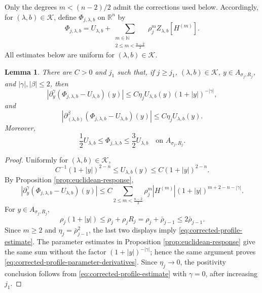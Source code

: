 \documentclass[11pt]{article}
\numberwithin{equation}{section}
\newtheorem{lemma}[theorem]{Lemma}
\theoremstyle{remark}
\newcommand{\R}{\mathbb R}
\begin{document}
Only the degrees \(m<(n-2)/2\) admit the corrections used below. Accordingly,
for \((\lambda,b)\in\mathcal K\), define
\(\Phi_{j,\lambda,b}\) on \(\R^n\) by
\begin{equation}\label{eq:corrected-profile}
 \Phi_{j,\lambda,b}
 =U_{\lambda,b}
 +\sum_{\substack{m\in\mathbb N\\2\le m<\frac{n-2}{2}}}
  \rho_j^mZ_{\lambda,b}[H^{(m)}].
\end{equation}
{
All estimates below are uniform for
\((\lambda,b)\in\mathcal K\).}
\begin{lemma}\label{lem:corrected-profile-estimate}
There are \(C>0\) and \(j_1\) such that, if \(j\ge j_1\),
\((\lambda,b)\in\mathcal K\), \(y\in A_{\sigma_j,R_j}\), and
\(|\gamma|,|\beta|\le2\), then
\begin{equation}\label{eq:corrected-profile-estimate}
 \left|
 \partial_y^\gamma
 (\Phi_{j,\lambda,b}-U_{\lambda,b})(y)
 \right|
 \le C\eta_jU_{\lambda,b}(y)(1+|y|)^{-|\gamma|},
\end{equation}
and
\begin{equation}\label{eq:corrected-profile-parameter-derivatives}
 \left|
 \partial_{(\lambda,b)}^\beta
 (\Phi_{j,\lambda,b}-U_{\lambda,b})(y)
 \right|
 \le C\eta_jU_{\lambda,b}(y).
\end{equation}
Moreover,
\[
 \frac12U_{\lambda,b}
 \le\Phi_{j,\lambda,b}
 \le\frac32U_{\lambda,b}
 \quad\text{on }A_{\sigma_j,R_j}.
\]
\end{lemma}

\begin{proof}
Uniformly for \((\lambda,b)\in\mathcal K\),
\[
 C^{-1}(1+|y|)^{2-n}
 \le U_{\lambda,b}(y)
 \le C(1+|y|)^{2-n}.
\]
By Proposition  \ref{prop:euclidean-response},
\[
 \left|
 \partial_y^\gamma
 (\Phi_{j,\lambda,b}-U_{\lambda,b})(y)
 \right|
 \le C\sum_{2\le m<\frac{n-2}{2}}
 \rho_j^m|H^{(m)}|
 (1+|y|)^{m+2-n-|\gamma|}.
\]
For \(y\in A_{\sigma_j,R_j}\),
\[
 \rho_j(1+|y|)
 \le\rho_j+\rho_jR_j
 =\rho_j+\bar\rho_{j-1}
 \le2\bar\rho_{j-1}.
\]
Since \(m\ge2\) and
\(\eta_j=\bar\rho_{j-1}^2\), the last two displays imply
\eqref{eq:corrected-profile-estimate}. {The parameter estimates in
Proposition  \ref{prop:euclidean-response} give the same sum without the factor
\((1+|y|)^{-|\gamma|}\); hence the same argument proves
\eqref{eq:corrected-profile-parameter-derivatives}. Since \(\eta_j\to0\),
the positivity conclusion follows from \eqref{eq:corrected-profile-estimate}
with \(\gamma=0\), after increasing \(j_1\).}
\end{proof}
\end{document}
